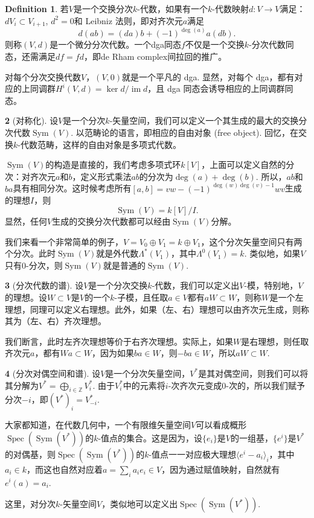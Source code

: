 \documentclass[12pt]{article}
\theoremstyle{definition}
\newtheorem{para}{}[section]
\newtheorem{defi}[para]{Definition}
\theoremstyle{plain}
\begin{document}
\begin{defi}
    若$V$是一个交换分次$k$-代数，如果有一个$k$-代数映射$d:V\to V$满足：$dV_i\subset V_{i+1}$, $d^2=0$和 Leibniz 法则，即对齐次元$a$满足
    \[
        d(ab)=(da)b+(-1)^{\deg(a)}a(db).
    \]
    则称$(V,d)$是一个微分分次代数。一个dga同态$f$不仅是一个交换$k$-分次代数同态，还需满足$df=fd$，即de Rham complex间拉回的推广。
\end{defi}

对每个分次交换代数$V$，$(V,0)$就是一个平凡的 dga. 
显然，对每个 dga，都有对应的上同调群$H^i(V,d)=\ker d/\operatorname{im} d$，且 dga 同态会诱导相应的上同调群同态。

\begin{para}[对称化]
    设$V$是一个分次$k$-矢量空间，我们可以定义一个其生成的最大的交换分次代数$\operatorname{Sym}(V)$. 以范畴论的语言，即相应的自由对象 (free object). 回忆，在交换$k$-代数范畴，这样的自由对象是多项式代数。

    $\operatorname{Sym}(V)$的构造是直接的，我们考虑多项式环$k[V]$，上面可以定义自然的分次：对齐次元$a$和$b$，定义形式乘法$ab$的分次为$\deg(a)+\deg(b)$. 所以，$ab$和$ba$具有相同分次。这时候考虑所有$[a,b]=vw-(-1)^{\deg(w)\deg(v)-1}wv$生成的理想$I$，则
    \[
        \operatorname{Sym}(V)=k[V]/I.
    \]
    显然，任何$V$生成的交换分次代数都可以经由$\operatorname{Sym}(V)$分解。

    我们来看一个非常简单的例子，$V=V_0\oplus V_1=k\oplus V_1$，这个分次矢量空间只有两个分次。此时$\operatorname{Sym}(V)$就是外代数$\Lambda^*(V_1)$，其中$\Lambda^0(V_1)=k$. 类似地，如果$V$只有$0$-分次，则$\operatorname{Sym}(V)$就是普通的$\operatorname{Sym}(V)$.
\end{para}

\begin{para}[分次代数的谱]
    设$V$是一个分次交换$k$-代数，我们可以定义出$V$-模，特别地，$V$的理想。设$W\subset V$是$V$的一个$k$-子模，且任取$a\in V$都有$aW\subset W$，则称$W$是一个左理想，同理可以定义右理想。此外，如果（左、右）理想可以由齐次元生成，则称其为（左、右）齐次理想。

    我们断言，此时左齐次理想等价于右齐次理想。实际上，如果$W$是右理想，则任取齐次元$a$，都有$Wa\subset W$，因为如果$ba\in W$，则$-ba\in W$，所以$aW\subset W$.
\end{para}

\begin{para}[分次对偶空间和谱]
    设$V$是一个分次矢量空间，$V^*$是其对偶空间，则我们可以将其分解为$V^*=\bigoplus_{i\in\mathbb Z}V_i^*$. 由于$V_i^*$中的元素将$i$-次齐次元变成$0$-次的，所以我们赋予分次$-i$，即$(V^*)_i=V_{-i}^*$.

    大家都知道，在代数几何中，一个有限维矢量空间$V$可以看成概形$\operatorname{Spec}(\operatorname{Sym}(V^*))$的$k$-值点的集合。这是因为，设$\{e_i\}$是$V$的一组基，$\{e^i\}$是$V^*$的对偶基，则$\operatorname{Spec}(\operatorname{Sym}(V^*))$的$k$-值点一一对应极大理想$\langle e^i-a_i\rangle_i$，其中$a_i\in k$，而这也自然对应着$a=\sum_i a_ie_i\in V$，因为通过赋值映射，自然就有$e^i(a)=a_i$.

    这里，对分次$k$-矢量空间$V$，类似地可以定义出$\operatorname{Spec}(\operatorname{Sym}(V^*))$.
\end{para}
\end{document}
